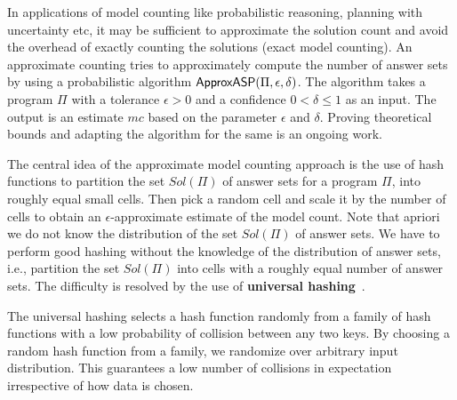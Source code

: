 \documentclass{svproc}
\newcommand{\fff}{\ensuremath{\Pi}\xspace}
\newcommand{\mc}{$mc$\xspace}
\newcommand{\ep}{$\epsilon$\xspace}
\newcommand{\del}{$\delta$\xspace}
\def\appasp{\normalfont \textsf{ApproxASP}\xspace}
\newcommand{\sol}{$Sol(\Pi)$\xspace}
\begin{document}
%
%
%
%
In applications of model counting like probabilistic reasoning, planning with uncertainty etc, it may be sufficient to approximate the solution count and avoid the overhead of exactly counting the solutions (exact model counting).
%
An approximate counting tries to approximately compute the number of answer sets by using a probabilistic algorithm $\appasp(\fff, \epsilon, \delta)$.
%
The algorithm takes a program $\fff$ with a tolerance $\epsilon > 0$ and a confidence $0 < \delta \leq 1$ as an input.
%
The output is an estimate \mc based on the parameter \ep and \del.
%
Proving theoretical bounds and adapting the algorithm for the same is an ongoing work.

The central idea of the approximate model counting approach is the use of hash functions to partition the set \sol of answer sets for a program $\fff$, into roughly equal small cells.
%
Then pick a random cell and scale it by the number of cells to obtain an \ep-approximate estimate of the model count.
%
Note that apriori we do not know the distribution of the set \sol of answer sets.
%
We have to perform good hashing without the knowledge of the distribution of answer sets, i.e., partition the set $Sol(\Pi)$ into cells with a roughly equal number of answer sets.
%
%
%
The difficulty is resolved by the use of \textbf{universal hashing}~\cite{DBLP:conf/stoc/CarterW77}.

The universal hashing selects a hash function randomly from a family of hash functions with a low probability of collision between any two keys. 
%
By choosing a random hash function from a family, we randomize over arbitrary input distribution. This guarantees a low number of collisions in expectation irrespective of how data is chosen.
\end{document}
